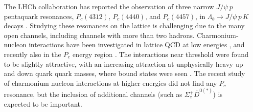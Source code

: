 The LHCb collaboration has reported the observation of three narrow $J/\psi\: p$ pentaquark resonances, $P_c(4312)$, $P_c(4440)$, and $P_c(4457)$, in $\Lambda_b \to J/\psi\,p\,K$ decays \cite{Aaij:2015tga, Aaij:2019vzc}.
Studying these resonances on the lattice is challenging due to the many open channels, including channels with more than two hadrons. Charmonium-nucleon
interactions have been investigated in lattice QCD at low energies \cite{Yokokawa:2006td, Liu:2008rza, Kawanai:2010ev, Beane:2014sda}, and recently also in the $P_c$ energy region \cite{Skerbis:2018lew}. The interactions near threshold were found to be slightly attractive, with an increasing attraction at unphysically heavy up and down quark quark masses, where bound states were seen \cite{Beane:2014sda}. The recent study of charmonium-nucleon interactions at higher energies \cite{Skerbis:2018lew} did not find any $P_c$ resonance, but the inclusion of additional channels (such as $\Sigma_c^+ \bar{D}^{0(*)}$) is expected to be important.










